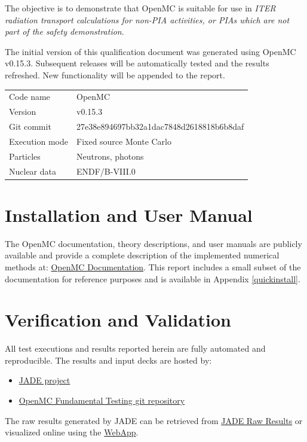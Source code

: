 \documentclass[11pt,a4paper]{article}
\begin{document}
The objective is to demonstrate that OpenMC is suitable for use in
\emph{ITER radiation transport calculations for non-PIA activities, or PIAs
which are not part of the safety demonstration}.

The initial version of this qualification document was generated using OpenMC v0.15.3. 
Subsequent releases will be automatically tested and the results refreshed. 
New functionality will be appended to the report.

\begin{longtable}{ll}
\toprule
Code name & OpenMC \\
Version & v0.15.3 \\
Git commit & 27e38e894697bb32a1dac7848d2618818b6b8daf \\
Execution mode & Fixed source Monte Carlo \\
Particles & Neutrons, photons \\
Nuclear data & ENDF/B-VIII.0 \\
\bottomrule
\end{longtable}

\section{Installation and User Manual}
The OpenMC documentation, theory descriptions, and user manuals are publicly
available and provide a complete description of the implemented numerical
methods at: \href{https://docs.openmc.org/en/stable/}{OpenMC Documentation}.
This report includes a small subset of the documentation for reference purposes and is available in Appendix \ref{quickinstall}.

\section{Verification and Validation}

All test executions and results reported herein are fully automated and reproducible. The results and input decks are hosted by:
\begin{itemize}
  \item \href{https://github.com/JADE-V-V/JADE}{JADE project}
  \item \href{https://github.com/openmc-dev/openmc-fundamental-testing}{OpenMC Fundamental Testing git repository}
\end{itemize}
The raw results generated by JADE can be retrieved from \href{https://github.com/JADE-V-V/JADE-RAW-RESULTS}{JADE Raw Results} 
or visualized online using the \href{https://github.com/JADE-V-V/JADE-WEB-APP}{WebApp}.
\end{document}
